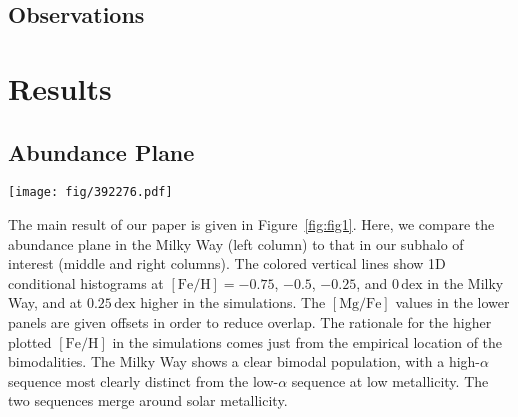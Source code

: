 \documentclass[linenumbers, twocolumn]{aastex631}
\newcommand{\FeH}{\ensuremath{[\textrm{Fe}/\textrm{H}]}}
\newcommand{\MgFe}{\ensuremath{[\textrm{Mg}/\textrm{Fe}]}}
\newcommand{\dex}{\ensuremath{\textrm{dex}}}
\begin{document}
\subsection{Observations}\label{ssec:obs}

\section{Results}\label{sec:results}
\subsection{Abundance Plane}\label{ssec:plane}

\begin{figure*}
  \centering
  \texttt{[image: fig/392276.pdf]}
  \caption{\textbf{When old stars are $\alpha$-enhanced, our subhalo of interest from TNG displays a prominent bimodality.} The upper left panel shows the distribution in the \MgFe{}-\FeH{} plane of the Milky Way, demonstrating a clear bimodality (data selection given in text). The lower left panel shows the 1D histograms of \MgFe{} at fixed \FeH{} values of $-0.5$, $-0.25$, $0$, and $0.25$ (blue, orange, green, and red, respectively). In the Milky Way, the bimodality is strongest at low metallicities while disappearing at high metallicities. The middle column shows the same plots but for our TNG subhalo of interest (392276) and with the fixed \FeH{} values $0.25\,\dex$ lower. No clear bimodality is detected at any metallicity. The right column shows the same subhalo but after increasing the \MgFe{} value of star particles formed before $z=1.5$ linearly with formation time (specifically by incrementing \MgFe{} by $0.1\times\left(t_{1.5}-t_{\textrm{form}}\right)$ if $t_{\textrm{form}} < t_{1.5}$, where $t_{1.5}$ is the age of the universe at $z=1.5$). A clear bimodality is shown in these panels which, unlike in the Milky Way, is present at all metallicities.}
  \label{fig:fig1}
\end{figure*}

The main result of our paper is given in Figure~\ref{fig:fig1}. Here, we compare the abundance plane in the Milky Way (left column) to that in our subhalo of interest (middle and right columns). The colored vertical lines show 1D conditional histograms at $\FeH=-0.75$, $-0.5$, $-0.25$, and $0\,\dex$ in the Milky Way, and at $0.25\,\dex$ higher in the simulations. The \MgFe{} values in the lower panels are given offsets in order to reduce overlap. The rationale for the higher plotted \FeH{} in the simulations comes just from the empirical location of the bimodalities. The Milky Way shows a clear bimodal population, with a high-$\alpha$ sequence most clearly distinct from the low-$\alpha$ sequence at low metallicity. The two sequences merge around solar metallicity.
\end{document}
